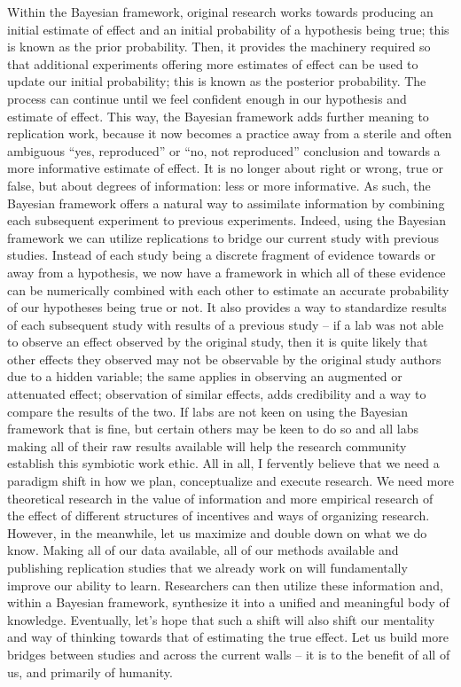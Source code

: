 \documentclass[12pt]{article}
\begin{document}
Within the Bayesian framework, original research works towards producing an initial estimate of effect and an initial probability of a hypothesis being true; this is known as the prior probability. Then, it provides the machinery required so that additional experiments offering more estimates of effect can be used to update our initial probability; this is known as the posterior probability. The process can continue until we feel confident enough in our hypothesis and estimate of effect. This way, the Bayesian framework adds further meaning to replication work, because it now becomes a practice away from a sterile and often ambiguous “yes, reproduced” or “no, not reproduced” conclusion and towards a more informative estimate of effect. It is no longer about right or wrong, true or false, but about degrees of information: less or more informative. As such, the Bayesian framework offers a natural way to assimilate information by combining each subsequent experiment to previous experiments.
Indeed, using the Bayesian framework we can utilize replications to bridge our current study with previous studies. Instead of each study being a discrete fragment of evidence towards or away from a hypothesis, we now have a framework in which all of these evidence can be numerically combined with each other to estimate an accurate probability of our hypotheses being true or not. It also provides a way to standardize results of each subsequent study with results of a previous study – if a lab was not able to observe an effect observed by the original study, then it is quite likely that other effects they observed may not be observable by the original study authors due to a hidden variable; the same applies in observing an augmented or attenuated effect; observation of similar effects, adds credibility and a way to compare the results of the two. If labs are not keen on using the Bayesian framework that is fine, but certain others may be keen to do so and all labs making all of their raw results available will help the research community establish this symbiotic work ethic.
All in all, I fervently believe that we need a paradigm shift in how we plan, conceptualize and execute research. We need more theoretical research in the value of information and more empirical research of the effect of different structures of incentives and ways of organizing research. However, in the meanwhile, let us maximize and double down on what we do know. Making all of our data available, all of our methods available and publishing replication studies that we already work on will fundamentally improve our ability to learn. Researchers can then utilize these information and, within a Bayesian framework, synthesize it into a unified and meaningful body of knowledge. Eventually, let’s hope that such a shift will also shift our mentality and way of thinking towards that of estimating the true effect. Let us build more bridges between studies and across the current walls – it is to the benefit of all of us, and primarily of humanity.
\end{document}
